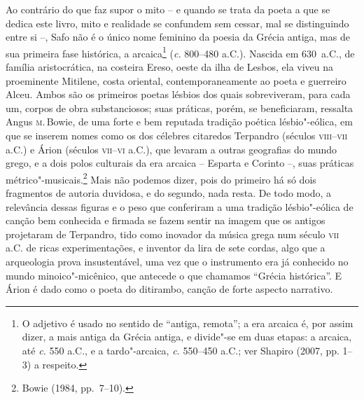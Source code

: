 \noindent{}Ao contrário do que faz supor o mito -- e quando se trata da poeta a que se
dedica este livro, mito e realidade se confundem sem cessar, mal se
distinguindo entre si --, Safo não é o único nome feminino da poesia da Grécia
	antiga, mas de sua primeira fase histórica, a arcaica\footnote{ O adjetivo é
	usado no sentido de “antiga, remota”; a era arcaica é, por assim dizer, a mais
	antiga da Grécia antiga, e divide"-se em duas etapas: a arcaica, até \textit{c.}
	550 a.C., e a tardo"-arcaica, \textit{c.} 550--450 a.C.; ver Shapiro (2007, pp.
	1--3) a respeito.} (\textit{c.} 800--480 a.C.). Nascida em 630~a.C., de família
aristocrática, na costeira Ereso, oeste da ilha de Lesbos, ela viveu na
proeminente Mitilene, costa oriental, contemporaneamente ao poeta e guerreiro
Alceu. Ambos são os primeiros poetas lésbios dos quais sobreviveram, para cada
um, corpos de obra substanciosos; suas práticas, porém, se beneficiaram,
ressalta Angus \textsc{m}.\,Bowie, de uma forte e bem reputada tradição
poética lésbio"-eólica, em que se inserem nomes como os dos célebres citaredos
Terpandro (séculos \textsc{viii}--\textsc{vii} a.C.) e Árion (séculos
\textsc{vii}--\textsc{vi} a.C.), que levaram a
outras geografias do mundo grego, e a dois polos culturais da era arcaica --
	Esparta e Corinto --, suas práticas métrico"-musicais.\footnote{ Bowie (1984,
	pp.~7--10).} Mais não podemos dizer,
pois do primeiro há só dois fragmentos de autoria duvidosa, e do segundo, nada
resta. De todo modo, a relevância dessas figuras e o peso que conferiram a uma
tradição lésbio"-eólica de canção bem conhecida e firmada se
fazem sentir na imagem que os antigos projetaram de Terpandro, tido como
inovador da música grega num século \textsc{vii} a.C. de ricas experimentações, e
inventor da lira de sete cordas, algo que a arqueologia prova insustentável,
uma vez que o instrumento era já conhecido no mundo minoico"-micênico, que
antecede o que chamamos “Grécia histórica”. E Árion é dado como o
poeta do ditirambo, canção de forte aspecto narrativo.

